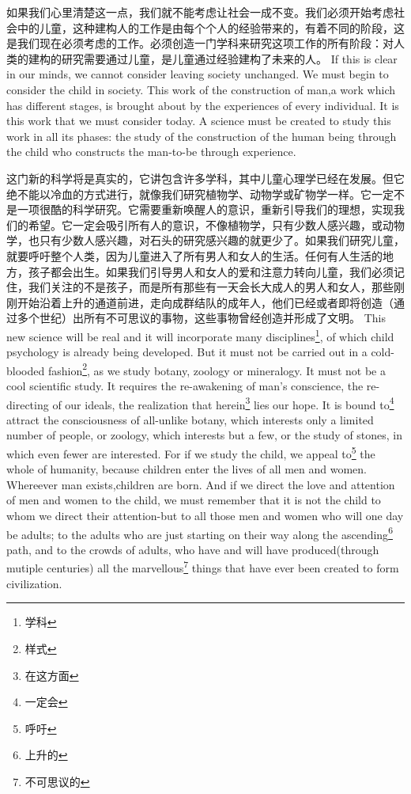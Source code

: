 \documentclass[lang=cn,10pt]{elegantbook}
\begin{document}
\begin{tcolorbox}[title=译文,
colback=red!5!white,
colframe=red!75!black,
fonttitle=\bfseries]
如果我们心里清楚这一点，我们就不能考虑让社会一成不变。我们必须开始考虑社会中的儿童，这种建构人的工作是由每个个人的经验带来的，有着不同的阶段，这是我们现在必须考虑的工作。必须创造一门学科来研究这项工作的所有阶段：对人类的建构的研究需要通过儿童，是儿童通过经验建构了未来的人。
If this is clear in our minds, we cannot consider leaving society unchanged. We must begin to consider the child in society. This work of the construction of man,a work which has different stages, is brought about by the experiences of every individual. It is this work that we must consider today. A science must be created to study this work in all its phases: the study of the construction of the human being through the child who constructs the man-to-be through experience.
\end{tcolorbox}

\begin{tcolorbox}[title=译文,
colback=red!5!white,
colframe=red!75!black,
fonttitle=\bfseries]
这门新的科学将是真实的，它讲包含许多学科，其中儿童心理学已经在发展。但它绝不能以冷血的方式进行，就像我们研究植物学、动物学或矿物学一样。它一定不是一项很酷的科学研究。它需要重新唤醒人的意识，重新引导我们的理想，实现我们的希望。它一定会吸引所有人的意识，不像植物学，只有少数人感兴趣，或动物学，也只有少数人感兴趣，对石头的研究感兴趣的就更少了。如果我们研究儿童，就要呼吁整个人类，因为儿童进入了所有男人和女人的生活。任何有人生活的地方，孩子都会出生。如果我们引导男人和女人的爱和注意力转向儿童，我们必须记住，我们关注的不是孩子，而是所有那些有一天会长大成人的男人和女人，那些刚刚开始沿着上升的通道前进，走向成群结队的成年人，他们已经或者即将创造（通过多个世纪）出所有不可思议的事物，这些事物曾经创造并形成了文明。
This new science will be real and it will incorporate many disciplines\footnote{学科}, of which child psychology is already being developed. But it must not be carried out in a cold-blooded fashion\footnote{样式}, as we study botany, zoology or mineralogy. It must not be a cool scientific study. It requires the re-awakening of man's conscience, the re-directing of our ideals, the realization that herein\footnote{在这方面} lies our hope. It is bound to\footnote{一定会} attract the consciousness of all-unlike botany, which interests only a limited number of people, or zoology, which interests but a few, or the study of stones, in which even fewer are interested. For if we study the child, we appeal to\footnote{呼吁} the whole of humanity, because children enter the lives of all men and women. Whereever man exists,children are born. And if we direct the love and attention of men and women to the child, we must remember that it is not the child to whom we direct their attention-but to all those men and women who will one day be adults; to the adults who are just starting on their way along the ascending\footnote{上升的} path, and to the crowds of adults, who have and will have produced(through mutiple centuries) all the marvellous\footnote{不可思议的} things that have ever been created to form civilization.
\end{tcolorbox}
\end{document}
